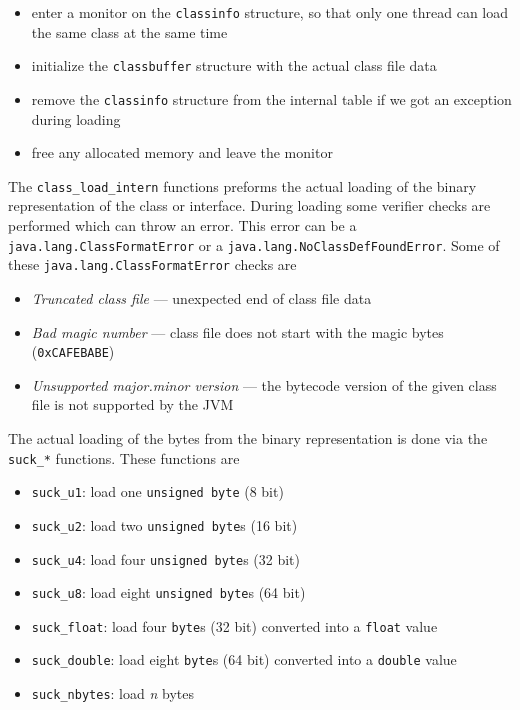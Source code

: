 \begin{itemize}
 \item enter a monitor on the \texttt{classinfo} structure, so that
 only one thread can load the same class at the same time

 \item initialize the \texttt{classbuffer} structure with the actual
 class file data

 \item remove the \texttt{classinfo} structure from the internal table
 if we got an exception during loading

 \item free any allocated memory and leave the monitor
\end{itemize}

The \texttt{class\_load\_intern} functions preforms the actual loading
of the binary representation of the class or interface. During loading
some verifier checks are performed which can throw an error. This
error can be a \texttt{java.lang.ClassFormatError} or a
\texttt{java.lang.NoClassDefFoundError}. Some of these
\texttt{java.lang.ClassFormatError} checks are

\begin{itemize}
 \item \textit{Truncated class file} --- unexpected end of class file
 data

 \item \textit{Bad magic number} --- class file does not start with
 the magic bytes (\texttt{0xCAFEBABE})

 \item \textit{Unsupported major.minor version} --- the bytecode
 version of the given class file is not supported by the JVM
\end{itemize}

The actual loading of the bytes from the binary representation is done
via the \texttt{suck\_*} functions. These functions are

\begin{itemize}
 \item \texttt{suck\_u1}: load one \texttt{unsigned byte} (8 bit)

 \item \texttt{suck\_u2}: load two \texttt{unsigned byte}s (16 bit)

 \item \texttt{suck\_u4}: load four \texttt{unsigned byte}s (32 bit)

 \item \texttt{suck\_u8}: load eight \texttt{unsigned byte}s (64 bit)

 \item \texttt{suck\_float}: load four \texttt{byte}s (32 bit)
 converted into a \texttt{float} value

 \item \texttt{suck\_double}: load eight \texttt{byte}s (64 bit)
 converted into a \texttt{double} value

 \item \texttt{suck\_nbytes}: load \textit{n} bytes
\end{itemize}

